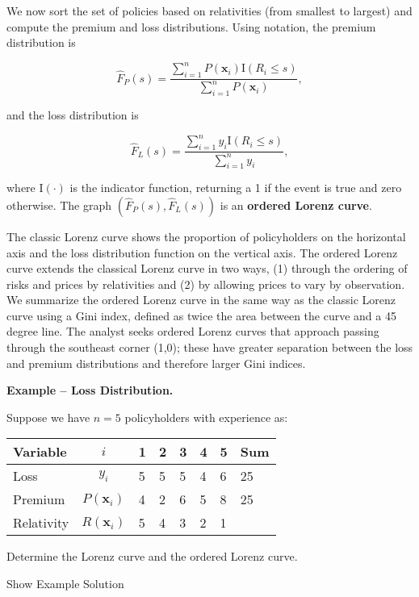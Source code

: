 \documentclass[]{book}
\theoremstyle{definition}
\theoremstyle{definition}
\theoremstyle{definition}
\theoremstyle{remark}
\begin{document}
We now sort the set of policies based on relativities (from smallest to
largest) and compute the premium and loss distributions. Using notation,
the premium distribution is

\begin{equation}
\hat{F}_P(s) =  \frac{ \sum_{i=1}^n
P(\mathbf{x}_i) \mathrm{I}(R_i \leq s) }{\sum_{i=1}^n P(\mathbf{x}_i)} ,\label{eq:EmpPremDF}
\end{equation}

and the loss distribution is

\begin{equation}
\hat{F}_{L}(s) =  \frac{ \sum_{i=1}^n y_i \mathrm{I}(R_i
\leq s) }{\sum_{i=1}^n y_i} ,\label{eq:EmpLossDF}
\end{equation}

where \(\mathrm{I}(\cdot)\) is the indicator function, returning a 1 if
the event is true and zero otherwise. The graph
\(\left(\hat{F}_P(s),\hat{F}_{L}(s) \right)\) is an \textbf{ordered
Lorenz curve}.

The classic Lorenz curve shows the proportion of policyholders on the
horizontal axis and the loss distribution function on the vertical axis.
The ordered Lorenz curve extends the classical Lorenz curve in two ways,
(1) through the ordering of risks and prices by relativities and (2) by
allowing prices to vary by observation. We summarize the ordered Lorenz
curve in the same way as the classic Lorenz curve using a Gini index,
defined as twice the area between the curve and a 45 degree line. The
analyst seeks ordered Lorenz curves that approach passing through the
southeast corner (1,0); these have greater separation between the loss
and premium distributions and therefore larger Gini indices.

\textbf{Example -- Loss Distribution.}

Suppose we have \(n=5\) policyholders with experience as:

\begin{longtable}[]{@{}lcllllll@{}}
\toprule
Variable & \(i\) & 1 & 2 & 3 & 4 & 5 & Sum\tabularnewline
\midrule
\endhead
Loss & \(y_i\) & 5 & 5 & 5 & 4 & 6 & 25\tabularnewline
Premium & \(P(\mathbf{x}_i)\) & 4 & 2 & 6 & 5 & 8 & 25\tabularnewline
Relativity & \(R(\mathbf{x}_i)\) & 5 & 4 & 3 & 2 & 1 &\tabularnewline
\bottomrule
\end{longtable}

Determine the Lorenz curve and the ordered Lorenz curve.

Show Example Solution
\end{document}
